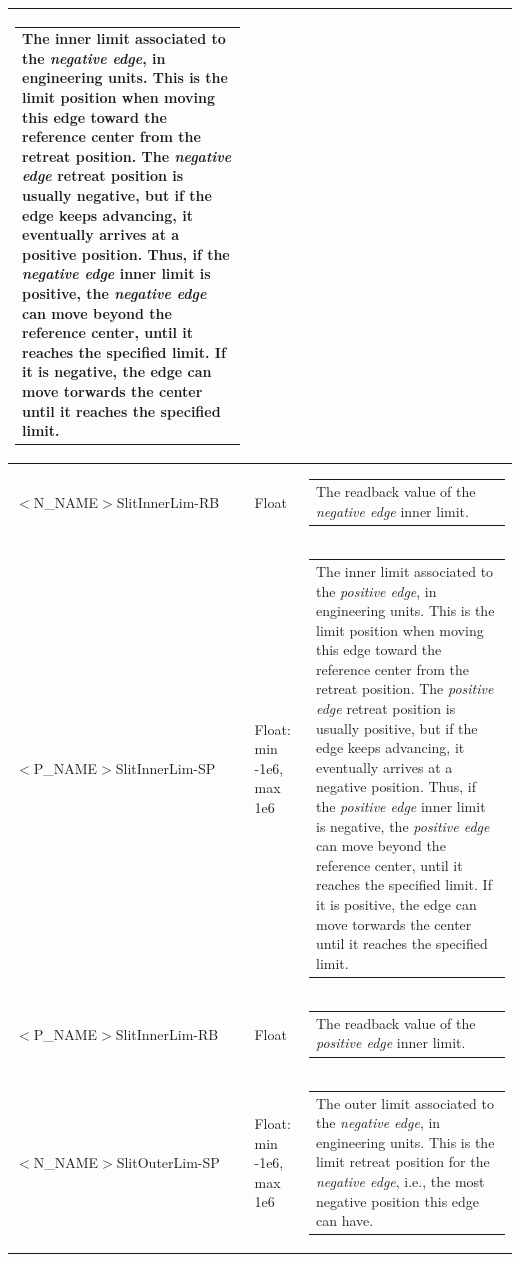 \documentclass[openany]{article}
\begin{document}
\begin{longtable}{| m{4.5cm} m{2.5cm}  m{7.0cm} |}
\begin{tabular}{@{}m{6cm}@{}}
                The inner limit associated to the \emph{negative edge}, in engineering units. This is the limit position when moving this edge toward the reference center from the retreat position. The \emph{negative edge} retreat position is usually negative, but if the edge keeps advancing, it eventually arrives at a positive position. Thus, if the \emph{negative edge} inner limit is positive, the \emph{negative edge} can move beyond the reference center, until it reaches the specified limit. If it is negative, the edge can move torwards the center until it reaches the specified limit.
            \end{tabular} \hypertarget{}{}\\ \hline
        $<$N\_NAME$>$SlitInnerLim-RB & Float & \begin{tabular}{@{}m{6cm}@{}}
                The readback value of the \emph{negative edge} inner limit.
            \end{tabular} \hypertarget{pv:pos-edge-inner-lim}{}\\ \hline
        $<$P\_NAME$>$SlitInnerLim-SP & Float: min -1e6, max 1e6 & \begin{tabular}{@{}m{6cm}@{}}
                The inner limit associated to the \emph{positive edge}, in engineering units. This is the limit position when moving this edge toward the reference center from the retreat position. The \emph{positive edge} retreat position is usually positive, but if the edge keeps advancing, it eventually arrives at a negative position. Thus, if the \emph{positive edge} inner limit is negative, the \emph{positive edge} can move beyond the reference center, until it reaches the specified limit. If it is positive, the edge can move torwards the center until it reaches the specified limit.
            \end{tabular} \hypertarget{}{}\\ \hline
        $<$P\_NAME$>$SlitInnerLim-RB & Float & \begin{tabular}{@{}m{6cm}@{}}
                The readback value of the \emph{positive edge} inner limit.
            \end{tabular} \hypertarget{pv:low-outer-lim}{}\\ \hline
        $<$N\_NAME$>$SlitOuterLim-SP & Float: min -1e6, max 1e6 & \begin{tabular}{@{}m{6cm}@{}}
                The outer limit associated to the \emph{negative edge}, in engineering units. This is the limit retreat position for the \emph{negative edge}, i.e., the most negative position this edge can have.

\end{tabular}
\end{longtable}
\end{document}
